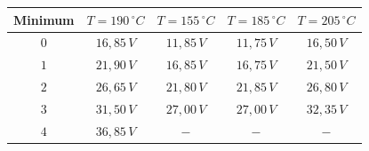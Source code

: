 \begin{center}
\begin{tabular}{c|c|c|c|c}
Minimum & \(T=190\,^\circ C\) & \(T=155\,^\circ C\) & \( T=185\,^\circ C\) & \(T=205\,^\circ C\)\\\hline
\(0\) & \(16,85\, V\) & \(11,85\, V\) & \(11,75\, V\) & \(16,50\, V\)\\
\(1\) & \(21,90\, V\) & \(16,85\, V\) & \(16,75\, V\) & \(21,50\, V\)\\
\(2\) & \(26,65\, V\) & \(21,80\, V\) & \(21,85\, V\) & \(26,80\, V\)\\
\(3\) & \(31,50\, V\) & \(27,00\, V\) & \(27,00\, V\) & \(32,35\, V\)\\
\(4\) & \(36,85\, V\) & \(-\) & \(-\) & \(-\)\\
\end{tabular}
\begin{minipage}{\linewidth}
\centering
{}
\label{graph_a1}
\end{minipage}
\begin{minipage}{\linewidth}
\centering
{}

\end{minipage}
\end{center}
